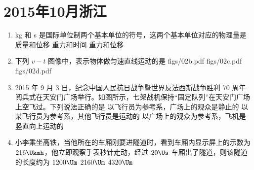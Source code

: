 \documentclass[\gkver]{gaokaozhenti}
\begin{document}
\chapter{2015年10月浙江}

\begin{enumerate}
\item
kg 和 s 是国际单位制两个基本单位的符号，这两个基本单位对应的物理量是
{质量和位移}
{重力和时间}
{重力和位移}

\item
下列 $v-t$ 图像中，表示物体做匀速直线运动的是
{figs/02b.pdf}
{figs/02c.pdf}
{figs/02d.pdf}

\item
2015 年 9 月 3 日，纪念中国人民抗日战争暨世界反法西斯战争胜利 70 周年阅兵式在天安门广场举行。如图所示，七架战机保持“固定队列”在天安门广场上空飞过。下列说法正确的是
{以飞行员为参考系，广场上的观众是静止的}
{以某飞行员为参考系，其他飞行员是运动的}
{以广场上的观众为参考系，飞机是竖直向上运动的}

\item
小李乘坐高铁，当他所在的车厢刚要进隧道时，看到车厢内显示屏上的示数为 $216\Ukmh$，他立即观察手表秒针走动，经过 $20\Us$ 车厢出了隧道，则该隧道的长度约为
\fourchoices[answer=B]
{$600\Um$}
{$1200\Um$}
{$2160\Um$}
{$4320\Um$}


\end{enumerate}
\end{document}
